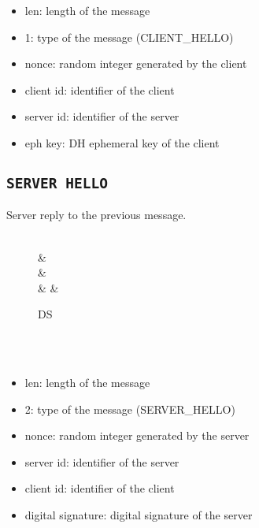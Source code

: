 \begin{itemize}
	\item len: length of the message
	\item 1: type of the message (CLIENT\_HELLO)
	\item nonce: random integer generated by the client
	\item client id: identifier of the client
	\item server id: identifier of the server
	\item eph key: DH ephemeral key of the client
\end{itemize}

\subsection{\texttt{SERVER HELLO}}
Server reply to the previous message.
\begin{figure}[h]
	\centering
	\begin{bytefield}[bitwidth=1.1em]{32}
		 \\
		&  \\
		&  \\
		& 
		&  \\
		\begin{rightwordgroup}{DS}
			 \\
			 \\
		\end{rightwordgroup} \\
	\end{bytefield}
\end{figure}

\begin{itemize}
	\item len: length of the message
	\item 2: type of the message (SERVER\_HELLO)
	\item nonce: random integer generated by the server
	\item server id: identifier of the server
	\item client id: identifier of the client
	\item digital signature: digital signature of the server
\end{itemize}


